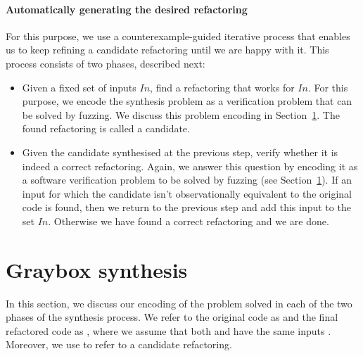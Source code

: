 \documentclass[runningheads,a4paper]{llncs}
\begin{document}
\paragraph{{\bf Automatically generating the desired refactoring}}

For this purpose, we use a counterexample-guided iterative process that enables us to keep refining a candidate refactoring until we are happy with it. This process consists of two phases, described next:
  \begin{itemize}
  \item[{\bf Phase 1:}] Given a fixed set of inputs $In$, find a refactoring that works for $In$. For this purpose, we encode   
    the synthesis problem as a verification problem that can be solved by fuzzing. We discuss this problem encoding in
    Section~\ref{sec:encoding}. The found refactoring is called a candidate.
  \item[{\bf Phase 2:}] Given the candidate synthesised at the previous step, verify whether it is indeed a correct refactoring.
    Again, we answer this question by encoding it as a software verification problem to be solved by fuzzing (see Section~\ref{sec:encoding}).
    If an input for which the candidate isn't observationally equivalent to the original code is found, then
    we return to the previous step and add this input to the set $In$. Otherwise we have found a correct refactoring and we are done.
  \end{itemize}




\section{Graybox synthesis}\label{sec:encoding}

In this section, we discuss our encoding of the problem solved in each
of the two phases of the synthesis process.  We refer to the original
code as  and the final refactored code as
, where we assume that both  and
 have the same inputs . Moreover,
we use  to refer to a candidate refactoring.

\end{document}
